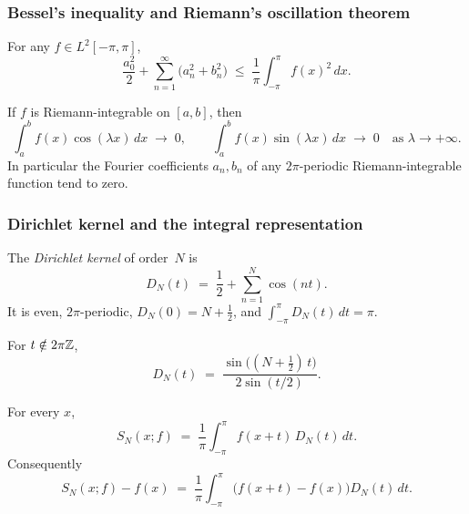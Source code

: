 \subsubsection*{Bessel's inequality and Riemann's oscillation theorem}

\begin{theorem}
\label{thm:bessel}
For any $f \in L^2[-\pi, \pi]$,
\[
  \frac{a_0^2}{2} + \sum_{n=1}^{\infty} \bigl(a_n^2 + b_n^2\bigr)
  \;\le\; \frac{1}{\pi} \int_{-\pi}^{\pi} f(x)^2\, dx.
\]
\end{theorem}

\begin{theorem}
\label{thm:riemann-lebesgue}
If $f$ is Riemann-integrable on $[a, b]$, then
\[
  \int_{a}^{b} f(x) \cos(\lambda x)\, dx \;\to\; 0,
  \qquad
  \int_{a}^{b} f(x) \sin(\lambda x)\, dx \;\to\; 0
  \quad \text{as } \lambda \to +\infty.
\]
In particular the Fourier coefficients $a_n, b_n$ of any
$2\pi$-periodic Riemann-integrable function tend to zero.
\end{theorem}

\subsubsection*{Dirichlet kernel and the integral representation}

\begin{definition}
\label{def:dirichlet-kernel}
The \emph{Dirichlet kernel} of order~$N$ is
\[
  D_N(t) \;=\; \frac{1}{2} + \sum_{n=1}^{N} \cos(nt).
\]
It is even, $2\pi$-periodic, $D_N(0) = N + \tfrac12$, and
$\int_{-\pi}^{\pi} D_N(t)\, dt = \pi$.
\end{definition}

\begin{lemma}
\label{lem:dirichlet-closed}
For $t \notin 2\pi\mathbb{Z}$,
\[
  D_N(t) \;=\; \frac{\sin\bigl((N + \tfrac12)\, t\bigr)}{2 \sin(t/2)}.
\]
\end{lemma}

\begin{theorem}
\label{thm:integral-rep}
For every $x$,
\[
  S_N(x; f) \;=\; \frac{1}{\pi} \int_{-\pi}^{\pi} f(x + t)\, D_N(t)\, dt.
\]
Consequently
\[
  S_N(x; f) - f(x) \;=\; \frac{1}{\pi} \int_{-\pi}^{\pi} \bigl(f(x + t) - f(x)\bigr) D_N(t)\, dt.
\]
\end{theorem}

